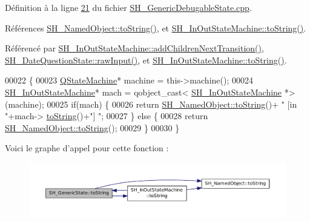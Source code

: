 Définition à la ligne \hyperlink{SH__GenericDebugableState_8cpp_source_l00021}{21} du fichier \hyperlink{SH__GenericDebugableState_8cpp_source}{S\-H\-\_\-\-Generic\-Debugable\-State.\-cpp}.



Références \hyperlink{classSH__NamedObject_af73e97f6476ca1ef3a22b159d179f5e7}{S\-H\-\_\-\-Named\-Object\-::to\-String()}, et \hyperlink{classSH__InOutStateMachine_a60ecd7de03d948e2d1e9cbedb5c3e5fa}{S\-H\-\_\-\-In\-Out\-State\-Machine\-::to\-String()}.



Référencé par \hyperlink{classSH__InOutStateMachine_a689e5513ef6ef3fc1598efacd413372e}{S\-H\-\_\-\-In\-Out\-State\-Machine\-::add\-Children\-Next\-Transition()}, \hyperlink{classSH__DateQuestionState_ac72e5b6b416614631032ff643d3c180e}{S\-H\-\_\-\-Date\-Question\-State\-::raw\-Input()}, et \hyperlink{classSH__InOutStateMachine_a60ecd7de03d948e2d1e9cbedb5c3e5fa}{S\-H\-\_\-\-In\-Out\-State\-Machine\-::to\-String()}.


\begin{DoxyCode}
00022 \{
00023     \hyperlink{classQStateMachine}{QStateMachine}* machine = this->machine();
00024     \hyperlink{classSH__InOutStateMachine}{SH\_InOutStateMachine}* mach = qobject\_cast<
      \hyperlink{classSH__InOutStateMachine}{SH\_InOutStateMachine} *>(machine);
00025     \textcolor{keywordflow}{if}(mach) \{
00026         \textcolor{keywordflow}{return} \hyperlink{classSH__NamedObject_af73e97f6476ca1ef3a22b159d179f5e7}{SH\_NamedObject::toString}()+ \textcolor{stringliteral}{" [in "}+mach->
      \hyperlink{classSH__InOutStateMachine_a60ecd7de03d948e2d1e9cbedb5c3e5fa}{toString}()+\textcolor{stringliteral}{"] "};
00027     \} \textcolor{keywordflow}{else} \{
00028         \textcolor{keywordflow}{return} \hyperlink{classSH__NamedObject_af73e97f6476ca1ef3a22b159d179f5e7}{SH\_NamedObject::toString}();
00029     \}
00030 \}
\end{DoxyCode}


Voici le graphe d'appel pour cette fonction \-:\nopagebreak
\begin{figure}[H]
\begin{center}
\leavevmode
\includegraphics[width=350pt]{classSH__GenericState_a5480c5ee725fd801d8f6292cd4c803b8_cgraph}
\end{center}
\end{figure}




